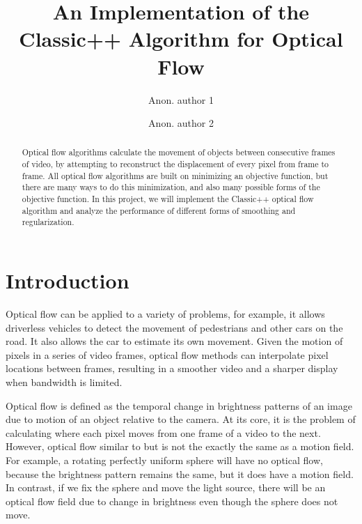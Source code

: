 \documentclass[10pt,twocolumn,letterpaper]{article}
\begin{document}
\title{An Implementation of the Classic++ Algorithm for Optical Flow}

\author{Anon. author 1
\and
Anon. author 2
}

\maketitle
\begin{abstract}
Optical flow algorithms calculate the movement of objects between consecutive frames of video, by attempting to reconstruct the displacement of every pixel from frame to frame. All optical flow algorithms are built on minimizing an objective function, but there are many ways to do this minimization, and also many possible forms of the objective function. In this project, we will implement the Classic++ optical flow algorithm and analyze the performance of different forms of smoothing and regularization.
\end{abstract}


\section{Introduction}

Optical flow can be applied to a variety of problems, for example, it allows driverless vehicles to detect the movement of pedestrians and other cars on the road. It also allows the car to estimate its own movement. Given the motion of pixels in a series of video frames, optical flow methods can interpolate pixel locations between frames, resulting in a smoother video and a sharper display when bandwidth is limited.

Optical flow is defined as the temporal change in brightness patterns of an image due to motion of an object relative to the camera. At its core, it is the problem of calculating where each pixel moves from one frame of a video to the next. \cite{fleet} However, optical flow similar to but is not the exactly the same as a motion field. For example, a rotating perfectly uniform sphere will have no optical flow, because the brightness pattern remains the same, but it does have a motion field. In contrast, if we fix the sphere and move the light source, there will be an optical flow field due to change in brightness even though the sphere does not move.
\end{document}
